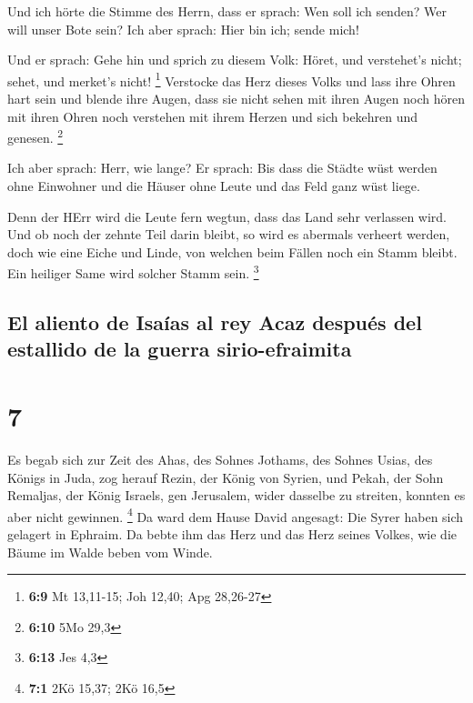  Und ich hörte die Stimme des Herrn, dass er sprach: Wen
soll ich senden? Wer will unser Bote sein? Ich aber sprach: Hier bin
ich; sende mich!

 Und er sprach: Gehe hin und sprich zu diesem Volk: Höret,
und verstehet's nicht; sehet, und merket's nicht! \footnote{\textbf{6:9}
  Mt 13,11-15; Joh 12,40; Apg 28,26-27}  Verstocke das
Herz dieses Volks und lass ihre Ohren hart sein und blende ihre Augen,
dass sie nicht sehen mit ihren Augen noch hören mit ihren Ohren noch
verstehen mit ihrem Herzen und sich bekehren und genesen. \footnote{\textbf{6:10}
  5Mo 29,3}

 Ich aber sprach: Herr, wie lange? Er sprach: Bis dass
die Städte wüst werden ohne Einwohner und die Häuser ohne Leute und das
Feld ganz wüst liege.

 Denn der HErr wird die Leute fern wegtun, dass das Land
sehr verlassen wird.  Und ob noch der zehnte Teil darin
bleibt, so wird es abermals verheert werden, doch wie eine Eiche und
Linde, von welchen beim Fällen noch ein Stamm bleibt. Ein heiliger Same
wird solcher Stamm sein. \footnote{\textbf{6:13} Jes 4,3}

\hypertarget{el-aliento-de-isauxedas-al-rey-acaz-despuuxe9s-del-estallido-de-la-guerra-sirio-efraimita}{%
\subsection{El aliento de Isaías al rey Acaz después del estallido de la
guerra
sirio-efraimita}\label{el-aliento-de-isauxedas-al-rey-acaz-despuuxe9s-del-estallido-de-la-guerra-sirio-efraimita}}

\hypertarget{section-6}{%
\section{7}\label{section-6}}

 Es begab sich zur Zeit des Ahas, des Sohnes Jothams, des
Sohnes Usias, des Königs in Juda, zog herauf Rezin, der König von
Syrien, und Pekah, der Sohn Remaljas, der König Israels, gen Jerusalem,
wider dasselbe zu streiten, konnten es aber nicht gewinnen. \footnote{\textbf{7:1}
  2Kö 15,37; 2Kö 16,5}  Da ward dem Hause David angesagt:
Die Syrer haben sich gelagert in Ephraim. Da bebte ihm das Herz und das
Herz seines Volkes, wie die Bäume im Walde beben vom Winde.

